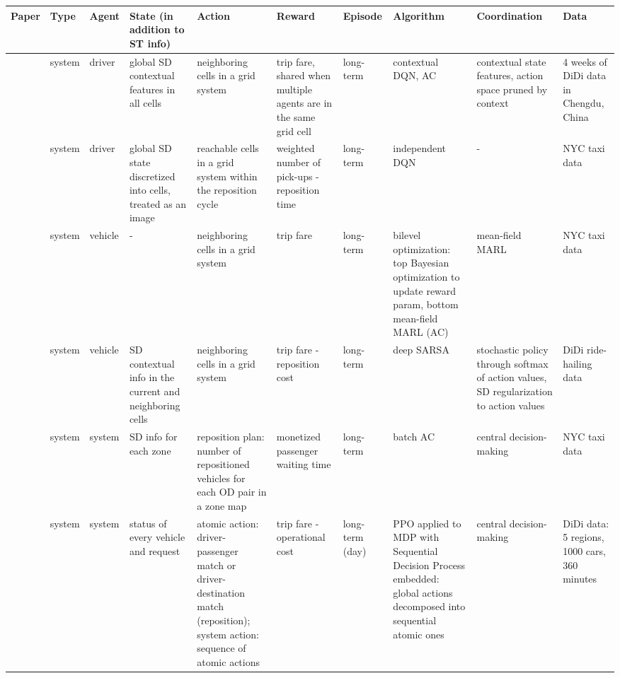 \documentclass{article}
\begin{document}
\begin{table}
\scriptsize
\begin{tabular}{||p{}|p{}|p{}|p{}|p{}|p{}|p{}|p{}|p{}|p{}||} 
\hline
Paper & Type & Agent & State (in addition to ST info) & Action & Reward & Episode & Algorithm & Coordination & Data \\
\hline
\hline
\cite{lin2018efficient} & system & driver & global SD contextual features in all cells & neighboring cells in a grid system & trip fare, shared when multiple agents are in the same grid cell & long-term & contextual DQN, AC & contextual state features, action space pruned by context & 4 weeks of DiDi data in Chengdu, China \\
\hline
\cite{oda2018movi} & system & driver & global SD state discretized into cells, treated as an image & reachable cells in a grid system within the reposition cycle & weighted number of pick-ups - reposition time & long-term & independent DQN & - & NYC taxi data \\
\hline
\cite{shou2020reward} & system & vehicle & - & neighboring cells in a grid system & trip fare & long-term & bilevel optimization: top Bayesian optimization to update reward param, bottom mean-field MARL (AC) & mean-field MARL & NYC taxi data \\
\hline
\cite{jtq2021repos} & system & vehicle & SD contextual info in the current and neighboring cells & neighboring cells in a grid system & trip fare - reposition cost & long-term & deep SARSA & stochastic policy through softmax of action values, SD regularization to action values & DiDi ride-hailing data \\
\hline
\cite{mao2020dispatch} & system & system & SD info for each zone & reposition plan: number of repositioned vehicles for each OD pair in a zone map & monetized passenger waiting time & long-term & batch AC  & central decision-making & NYC taxi data \\
\hline
\cite{feng2020scalable} & system & system & status of every vehicle and request & atomic action: driver-passenger match or driver-destination match (reposition);
system action: sequence of atomic actions & trip fare - operational cost & long-term (day) & PPO applied to MDP with Sequential Decision Process embedded: global actions decomposed into sequential atomic ones & central decision-making & DiDi data: 5 regions, 1000 cars, 360 minutes \\

\end{tabular}
\end{table}
\end{document}
